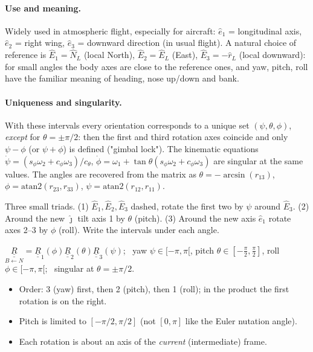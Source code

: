 \paragraph{Use and meaning.} Widely used in atmospheric flight, especially for aircraft: $\hat e_1$ = longitudinal axis, $\hat e_2$ = right wing,
$\hat e_3$ = downward direction (in usual flight). A natural choice of reference is $\hat E_1=\hat N_L$ (local North), $\hat E_2=\hat E_L$ (East),
$\hat E_3=-\hat r_L$ (local downward): for small angles the body axes are close to the reference ones, and yaw, pitch, roll have
the familiar meaning of heading, nose up/down and bank.

\paragraph{Uniqueness and singularity.} With these intervals every orientation corresponds to a unique set $(\psi,\theta,\phi)$, \emph{except}
for $\theta=\pm\pi/2$: then the first and third rotation axes coincide and only $\psi-\phi$ (or $\psi+\phi$) is defined ("gimbal lock").
The kinematic equations $\dot\psi=(s_\phi\omega_2+c_\phi\omega_3)/c_\theta$, $\dot\phi=\omega_1+\tan\theta(s_\phi\omega_2+c_\phi\omega_3)$ are
singular at the same values. The angles are recovered from the matrix as $\theta=-\arcsin(r_{13})$,
$\phi=\mathrm{atan2}(r_{23},r_{33})$, $\psi=\mathrm{atan2}(r_{12},r_{11})$.

\begin{fig2draw}
Three small triads. (1) $\hat E_1,\hat E_2,\hat E_3$ dashed, rotate the first two by $\psi$ around $\hat E_3$. (2) Around the new $\hat\jmath$
tilt axis 1 by $\theta$ (pitch). (3) Around the new axis $\hat e_1$ rotate axes 2--3 by $\phi$ (roll). Write the intervals under each angle.
\end{fig2draw}

\begin{keyf}
$\underset{B\leftarrow N}{\underline{\underline R}}=\underline{\underline R}_1(\phi)\underline{\underline R}_2(\theta)\underline{\underline R}_3(\psi)$; \
yaw $\psi\in[-\pi,\pi[$, pitch $\theta\in[-\frac\pi2,\frac\pi2]$, roll $\phi\in[-\pi,\pi[$; \ singular at $\theta=\pm\pi/2$.
\end{keyf}

\pitfalls
\begin{itemize}
\item Order: 3 (yaw) first, then 2 (pitch), then 1 (roll); in the product the first rotation is on the right.
\item Pitch is limited to $[-\pi/2,\pi/2]$ (not $[0,\pi]$ like the Euler nutation angle).
\item Each rotation is about an axis of the \emph{current} (intermediate) frame.
\end{itemize}

